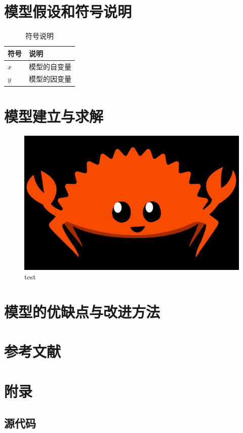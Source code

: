 \documentclass[UTF8]{ctexart}
\begin{document}
  \newpage

  \section{模型假设和符号说明}

  \begin{table}[h]
    \centering
    \caption{符号说明}
    \begin{tabular}{p{6em}l}
      \hline 
      符号 & 说明 \\
      \hline 
      $x$ & 模型的自变量 \\
      $y$ & 模型的因变量 \\
      \hline
    \end{tabular}
  \end{table}

  \newpage

  \section{模型建立与求解}

  \begin{figure}[h]
    \centering
    \includegraphics[scale=0.1]{rust.jpg}
    \caption{test}
  \end{figure}

  \newpage

  \section{模型的优缺点与改进方法}

  \newpage

  \section{参考文献}

  \newpage

  \appendix
  \setcounter{secnumdepth}{-2} 
  \section{附录}

  \setcounter{secnumdepth}{3} 
  \subsection{源代码}
\end{document}
